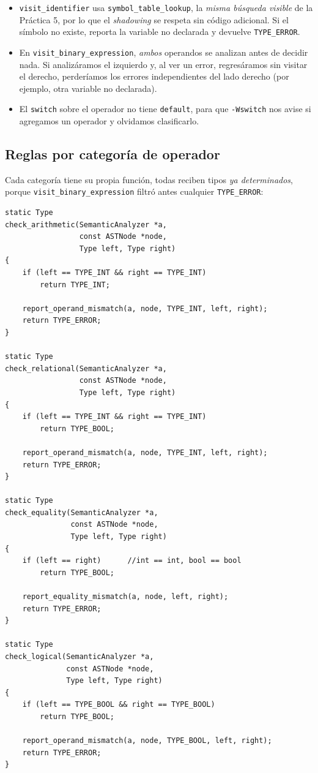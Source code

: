 \documentclass[12pt,letterpaper]{article}
\begin{document}
\bigskip

\begin{itemize}
\item \texttt{visit\_identifier} usa \texttt{symbol\_table\_lookup}, la \emph{misma búsqueda visible} de la
  Práctica 5, por lo que el \emph{shadowing} se respeta sin código adicional. Si el símbolo no existe,
  reporta la variable no declarada y devuelve \texttt{TYPE\_ERROR}.

\item En \texttt{visit\_binary\_expression}, \emph{ambos} operandos se analizan antes de decidir nada. Si
  analizáramos el izquierdo y, al ver un error, regresáramos sin visitar el derecho, perderíamos los
  errores independientes del lado derecho (por ejemplo, otra variable no declarada).

\item El \texttt{switch} sobre el operador no tiene \texttt{default}, para que \texttt{-Wswitch} nos avise si
  agregamos un operador y olvidamos clasificarlo.
\end{itemize}

\subsection*{Reglas por categoría de operador}

Cada categoría tiene su propia función, todas reciben tipos \emph{ya determinados}, porque
\texttt{visit\_binary\_expression} filtró antes cualquier \texttt{TYPE\_ERROR}:

\begin{lstlisting}[style=modernc, caption={\texttt{type\_checker.c}: reglas por categoría.}]
static Type
check_arithmetic(SemanticAnalyzer *a,
                 const ASTNode *node,
                 Type left, Type right)
{
    if (left == TYPE_INT && right == TYPE_INT)
        return TYPE_INT;

    report_operand_mismatch(a, node, TYPE_INT, left, right);
    return TYPE_ERROR;
}

static Type
check_relational(SemanticAnalyzer *a,
                 const ASTNode *node,
                 Type left, Type right)
{
    if (left == TYPE_INT && right == TYPE_INT)
        return TYPE_BOOL;

    report_operand_mismatch(a, node, TYPE_INT, left, right);
    return TYPE_ERROR;
}

static Type
check_equality(SemanticAnalyzer *a,
               const ASTNode *node,
               Type left, Type right)
{
    if (left == right)      //int == int, bool == bool
        return TYPE_BOOL;

    report_equality_mismatch(a, node, left, right);
    return TYPE_ERROR;
}

static Type
check_logical(SemanticAnalyzer *a,
              const ASTNode *node,
              Type left, Type right)
{
    if (left == TYPE_BOOL && right == TYPE_BOOL)
        return TYPE_BOOL;

    report_operand_mismatch(a, node, TYPE_BOOL, left, right);
    return TYPE_ERROR;
}
\end{lstlisting}
\end{document}
